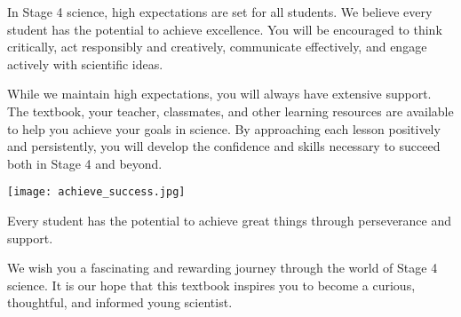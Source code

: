 In Stage 4 science, high expectations are set for all students. We believe every student has the potential to achieve excellence. You will be encouraged to think critically, act responsibly and creatively, communicate effectively, and engage actively with scientific ideas.

While we maintain high expectations, you will always have extensive support. The textbook, your teacher, classmates, and other learning resources are available to help you achieve your goals in science. By approaching each lesson positively and persistently, you will develop the confidence and skills necessary to succeed both in Stage 4 and beyond.

\begin{marginfigure}[0pt]
    \texttt{[image: achieve\_success.jpg]}
    \caption{Every student has the potential to achieve great things through perseverance and support.}
\end{marginfigure}

\FloatBarrier

We wish you a fascinating and rewarding journey through the world of Stage 4 science. It is our hope that this textbook inspires you to become a curious, thoughtful, and informed young scientist.